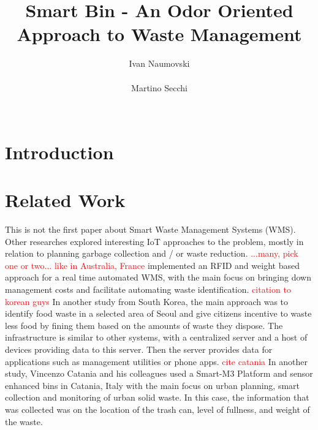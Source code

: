\documentclass{sigchi}
\newcommand\todo[1]{\textcolor{red}{#1}}
\begin{document}
\title{Smart Bin - An Odor Oriented Approach to Waste Management}

\author{
  \alignauthor Ivan Naumovski\\
    \\
  \alignauthor Martino Secchi\\
    \\
}

\maketitle

\begin{abstract}

\end{abstract}






\section{Introduction}


\section{Related Work}
This is not the first paper about Smart Waste Management Systems (WMS).
Other researches explored interesting IoT approaches to the problem, mostly in relation to planning garbage collection and / or waste reduction.
\todo{...many, pick one or two... like in Australia, France} implemented an RFID and weight  based approach for a real time automated WMS, with the main focus on bringing down management costs and facilitate automating waste identification.
\todo{ citation to korean guys } In another study from South Korea, the main approach was to identify food waste in a selected area of Seoul and give citizens incentive to waste less food by fining them based on the amounts of waste they dispose.
The infrastructure is similar to other systems, with a centralized server and a host of devices providing data to this server.
Then the server provides data for applications such as management utilities or phone apps.
\todo{ cite catania} In another study, Vincenzo Catania and his colleagues used a Smart-M3 Platform and sensor enhanced bins in Catania, Italy with the main focus on urban planning, smart collection and  monitoring of urban solid waste. In this case, the information that was collected was on the location of the trash can, level of fullness, and weight of the waste.
\end{document}
